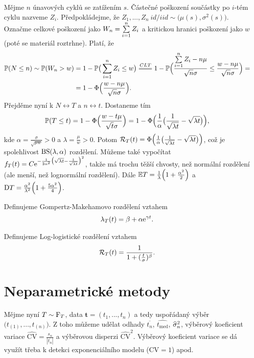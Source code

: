 \begin{define}
	 Mějme $n$ únavových cyklů se zatížením $s$. Částečné poškození součástky po $i$-tém cyklu nazveme $Z_i$. Předpokládejme, že $Z_1,...,Z_n~id/iid\sim \big(\mu(s),\sigma^2(s)\big)$. Označme celkové poškození jako $W_n=\sum\limits_{i=1}^{n} Z_i$ a kritickou hranici poškození jako $w$ (poté se materiál roztrhne). Platí, že 
	 \begin{align*}
	 \PP(N\leq n)\sim \PP(W_n>w)&=1-\PP\big(\sumin Z_i\leq 
	 w\big)\equal{CLT}1-\PP\Big(\frac{\sumin 
	 Z_i-n\mu}{\sqrt{n}\sigma}\leq 
	 \frac{w-n\mu}{\sqrt{n}\sigma}\Big)=\\&=1-\Phi\Big(\frac{w-n\mu}
	 {\sqrt{n}\sigma}\Big). 
	 \end{align*} 
	 Přejděme nyní k $N\leftrightarrow T$ a $n\leftrightarrow t$. Dostaneme tím 
	 $$ \mathbb{P}(T\leq 
	 t)=1-\Phi\Big(\frac{w-t\mu}{\sqrt{t}\sigma}\Big)=1-\Phi\Big(\frac{1}{\alpha}\big(\frac{1}{\sqrt{\lambda
	  t}}-\sqrt{\lambda t}\big)\Big), $$ kde 
	 $\alpha=\frac{\sigma}{\sqrt{\mu w}}>0$ a 
	 $\lambda=\frac{\mu}{w}>0$. Potom 
	 $\mathcal{R}_T(t)=\Phi\Big(\frac{1}{\alpha}\big(\frac{1}{\sqrt{\lambda 
	 t}}-\sqrt{\lambda t}\big)\Big)$, což je spolehlivost 
	 $\mathrm{BS}(\lambda,\alpha)$ rozdělení. Můžeme také vypočítat 
	 $f_T(t)=C\mathrm{e}^{-\frac{1}{2\alpha^2}\big(\sqrt{\lambda 
	 t}-\frac{1}{\sqrt{\lambda t}}\big)^2}$, takže má trochu těžší 
	 chvosty, než normální rozdělení (ale menší, než lognormální 
	 rozdělení). Dále $\mathbb{E} 
	 T=\frac{1}{\lambda}\Big(1+\frac{\alpha^2}{2}\Big)$ a $\mathrm{D} 
	 T=\frac{\alpha^2}{\lambda^2}\Big(1+\frac{5\alpha^2}{4}\Big)$.
\end{define}


\begin{define}
	Definujeme Gompertz-Makehamovo rozdělení vztahem 
	$$ \lambda_T(t)=\beta+\alpha \mathrm{e}^{\gamma t}. $$
\end{define}

\begin{define}
	Definujeme Log-logistické rozdělení vztahem 
	$$ \mathcal{R}_T(t)=\frac{1}{1+(\frac{t}{\sigma})^\beta}.$$

\end{define}

\section{Neparametrické metody}
Mějme nyní $T\sim\mathrm{F}_T$, data $\textbf{t}=(t_1,...,t_n)$ a tedy uspořádaný výběr $\big(t_{(1)},...,t_{(n)}\big)$. Z toho můžeme udělat odhady $\overline{t_n}$, $\widehat{t_\mathrm{med}}$, $\widehat{\sigma}_n^2$, výběrový koeficient variace $\widehat{\mathrm{CV}}=\frac{s_n}{|\overline{t_n}|}$ a výběrovou disperzi $\widehat{\mathrm{CV}}^2$. Výběrový koeficient variace se dá využít třeba k detekci exponenciálního modelu ($\mathrm{CV}=1$) apod.

